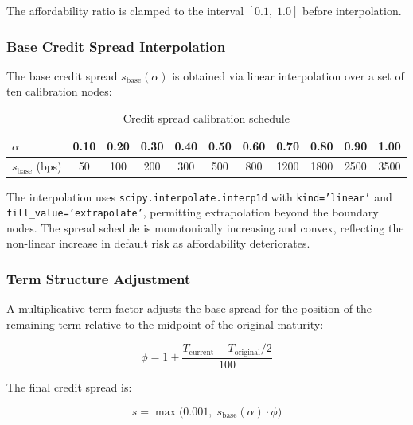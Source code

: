 \documentclass[11pt,a4paper]{article}
\begin{document}
The affordability ratio is clamped to the interval $[0.1,\; 1.0]$ before interpolation.

\subsubsection{Base Credit Spread Interpolation}

The base credit spread $s_{\text{base}}(\alpha)$ is obtained via linear interpolation
over a set of ten calibration nodes:

\begin{table}[H]
    \centering
    \caption{Credit spread calibration schedule}
    \label{tab:credit_spread_schedule}
    \begin{tabular}{@{}lcccccccccc@{}}
        \toprule
        $\alpha$ & 0.10 & 0.20 & 0.30 & 0.40 & 0.50 & 0.60 & 0.70 & 0.80 & 0.90 & 1.00 \\
        \midrule
        $s_{\text{base}}$ (bps) & 50 & 100 & 200 & 300 & 500 & 800 & 1200 & 1800 & 2500 & 3500 \\
        \bottomrule
    \end{tabular}
\end{table}

\noindent The interpolation uses \texttt{scipy.interpolate.interp1d} with
\texttt{kind='linear'} and \texttt{fill\_value='extrapolate'}, permitting extrapolation
beyond the boundary nodes. The spread schedule is monotonically increasing and convex,
reflecting the non-linear increase in default risk as affordability deteriorates.

\subsubsection{Term Structure Adjustment}

A multiplicative term factor adjusts the base spread for the position of the remaining
term relative to the midpoint of the original maturity:

\begin{equation}
\label{eq:term_factor}
\phi = 1 + \frac{T_{\text{current}} - T_{\text{original}} / 2}{100}
\end{equation}

\noindent The final credit spread is:

\begin{equation}
\label{eq:final_spread}
s = \max\!\bigl(0.001,\; s_{\text{base}}(\alpha) \cdot \phi\bigr)
\end{equation}
\end{document}
